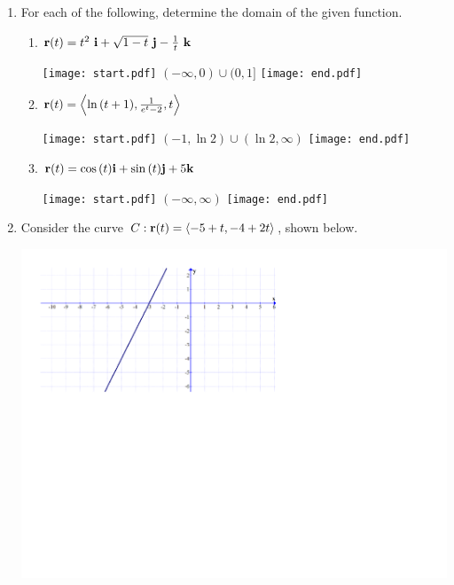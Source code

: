 \documentclass[12pt]{article}
\begin{document}
\begin{enumerate}

\item For each of the following, determine the domain of the given function.

\begin{enumerate}

\item ${\bf r}(t)=t^2\text{ }{\bf i}+\sqrt{1-t}\text{ }{\bf j}-\frac{1}{t}\text{ }{\bf k}$

\texttt{[image: start.pdf]}
{{$(-\infty,0)\cup(0,1]$}}
\texttt{[image: end.pdf]}


\item ${\bf r}(t)=\left\langle \ln{(t+1)}, \frac{1}{e^t-2}, t\right\rangle$

\texttt{[image: start.pdf]}
{{$(-1,\ln2)\cup(\ln2,\infty)$}}
\texttt{[image: end.pdf]}


\item ${\bf r}(t)=\cos{(t)}{\bf i}+\sin{(t)}{\bf j}+5{\bf k}$

\texttt{[image: start.pdf]}
{{$(-\infty,\infty)$}}
\texttt{[image: end.pdf]}


\end{enumerate}

\newpage

\item Consider the curve $C: {\bf r}(t)=\langle -5+t,-4+2t\rangle$, shown below.

\begin{center}
\includegraphics[scale=0.58]{line.pdf}
\end{center}


\end{enumerate}
\end{document}
